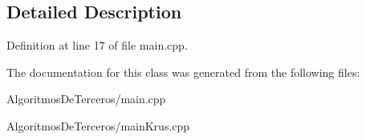 \subsection{Detailed Description}


Definition at line 17 of file main.\+cpp.



The documentation for this class was generated from the following files\+:\begin{DoxyCompactItemize}
\item 
Algoritmos\+De\+Terceros/main.\+cpp\item 
Algoritmos\+De\+Terceros/main\+Krus.\+cpp\end{DoxyCompactItemize}

